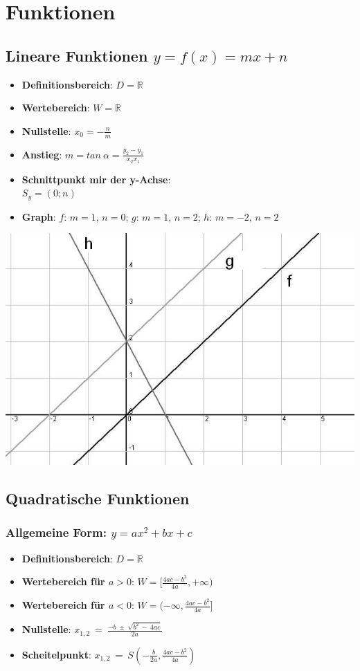 \chapter*{Funktionen}
\section*{Lineare Funktionen $y = f(x) = mx+n$}
\begin{itemize}
	\item \textbf{Definitionsbereich}: $ D = \mathbb{R} $
	\item \textbf{Wertebereich}: $ W = \mathbb{R} $
	\item \textbf{Nullstelle}: $ x_0 = -\frac{n}{m} $
	\item \textbf{Anstieg}: $ m = tan \ \alpha = \frac{y_2 - y_1}{x_2 x_1}
$
	\item \textbf{Schnittpunkt mir der y-Achse}:\\ $ S_y = (0;n) $
	\item \textbf{Graph}: $f$: $m =1$, $n=0$; $g$: $m=1$, $n=2$; $h$: $m=
-2$, $n=2$ \\
\end{itemize}
		\includegraphics[width=.6\textwidth]{img/LinF.jpg}

\section*{Quadratische Funktionen}
\subsection*{Allgemeine Form: $y= ax^2 + bx + c$}
\begin{itemize}
	\item \textbf{Definitionsbereich}: $ D = \mathbb{R} $
	\item \textbf{Wertebereich für $a>0$}: $ W = [\frac{4ac-b^2}{4a}, +\infty) $
	\item \textbf{Wertebereich für $a<0$}: $ W = (-\infty, \frac{4ac-b^2}{4a}] $
	\item \textbf{Nullstelle}: $ x_{1,2} \ = \ \frac {-b \ \pm \ \sqrt{b^2 \ - \ 4ac}} {2a} $
	\item \textbf{Scheitelpunkt}: $ x_{1,2} \ = \ S(-\frac{b}{2a}, \frac{4ac-b^2}{4a} )$
\end{itemize}

